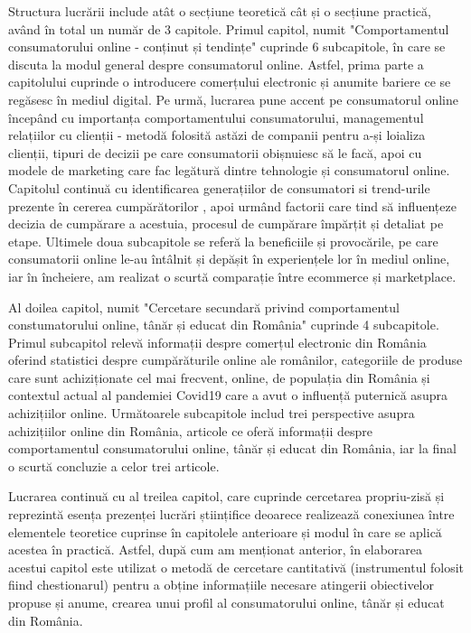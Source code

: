 \documentclass[a4paper, 12pt]{article}
\begin{document}
	\quad Structura lucrării include atât o secțiune teoretică cât și o secțiune practică, având în total un număr de 3 capitole. Primul capitol, numit "Comportamentul consumatorului online - conținut și tendințe" cuprinde 6 subcapitole, în care se discuta la modul general despre consumatorul online. Astfel, prima parte a capitolului cuprinde o introducere  comerțului electronic și anumite bariere ce se regăsesc în mediul digital. Pe urmă, lucrarea pune accent pe consumatorul online începând cu importanța comportamentului consumatorului,  managementul relațiilor cu clienții - metodă folosită astăzi de companii pentru a-și loializa clienții, tipuri de decizii pe care consumatorii obișnuiesc să le facă, apoi cu  modele de marketing care fac legătură dintre tehnologie și consumatorul online. Capitolul continuă cu identificarea generațiilor de consumatori si trend-urile prezente în cererea cumpărătorilor , apoi urmând factorii care tind să influențeze decizia de cumpărare a acestuia, procesul de cumpărare împărțit și detaliat pe etape. Ultimele doua subcapitole se referă la  beneficiile și provocările, pe care consumatorii online le-au întâlnit și depășit în experiențele lor în mediul online, iar în încheiere, am realizat o scurtă comparație între ecommerce și marketplace.
	
	\quad Al doilea capitol, numit "Cercetare secundară privind comportamentul constumatorului online, tânăr și educat din România" cuprinde 4 subcapitole. Primul subcapitol relevă informații despre comerțul electronic din România oferind statistici despre cumpărăturile online ale românilor, categoriile de produse care sunt achiziționate cel mai frecvent, online, de populația din România și contextul actual al pandemiei Covid19 care a avut o influență puternică asupra achizițiilor online. Următoarele subcapitole includ trei perspective asupra achizițiilor online din România, articole ce oferă informații despre comportamentul consumatorului online, tânăr și educat din România, iar la final o scurtă concluzie a celor trei articole.
	
	\quad Lucrarea continuă cu al treilea capitol, care cuprinde cercetarea propriu-zisă și reprezintă esența prezenței lucrări științifice deoarece realizează conexiunea între elementele teoretice cuprinse în capitolele anterioare și modul în care se aplică acestea în practică. Astfel, după cum am menționat anterior, în elaborarea acestui capitol este utilizat o metodă de cercetare cantitativă (instrumentul folosit fiind chestionarul) pentru a obține informațiile necesare atingerii obiectivelor propuse și anume, crearea unui profil al consumatorului online, tânăr și educat din România.
	
\end{document}
